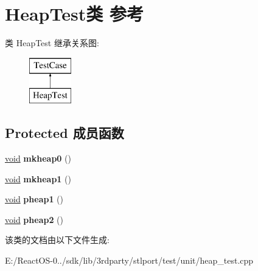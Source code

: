 \hypertarget{class_heap_test}{}\section{Heap\+Test类 参考}
\label{class_heap_test}
类 Heap\+Test 继承关系图\+:\begin{figure}[H]
\begin{center}
\leavevmode
\includegraphics[height=2.000000cm]{class_heap_test}
\end{center}
\end{figure}
\subsection*{Protected 成员函数}
\begin{DoxyCompactItemize}
\item 
\mbox{\label{class_heap_test_ab0c927f3ec3edcb5a0221cab11a040b5}} 
\hyperlink{interfacevoid}{void} {\bfseries mkheap0} ()
\item 
\mbox{\label{class_heap_test_a5d4ab9ad65497167e870bb74ac4f4452}} 
\hyperlink{interfacevoid}{void} {\bfseries mkheap1} ()
\item 
\mbox{\label{class_heap_test_a3dddad2e6d4de890f0f4aa600756bf6c}} 
\hyperlink{interfacevoid}{void} {\bfseries pheap1} ()
\item 
\mbox{\label{class_heap_test_a17c72b9d24daafec96c9f4db73bb3ff6}} 
\hyperlink{interfacevoid}{void} {\bfseries pheap2} ()
\end{DoxyCompactItemize}


该类的文档由以下文件生成\+:\begin{DoxyCompactItemize}
\item 
E\+:/\+React\+O\+S-\/0../sdk/lib/3rdparty/stlport/test/unit/heap\+\_\+test.\+cpp\end{DoxyCompactItemize}
